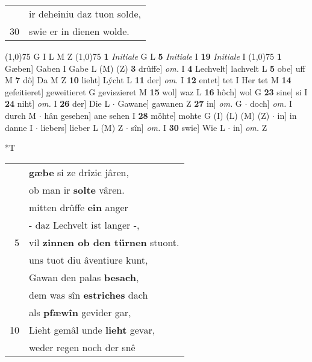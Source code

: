 \documentclass[8pt,a4paper,notitlepage]{article}
\begin{document}
\begin{table}[ht]
\begin{minipage}[t]{0.5\linewidth}
\begin{tabular}{rl}
 & ir deheiniu daz tuon solde,\\ 
30 & swie er in dienen wolde.\\ 
\end{tabular}
\scriptsize
\line(1,0){75} \newline
G I L M Z \newline
\line(1,0){75} \newline
\textbf{1} \textit{Initiale} G L  \textbf{5} \textit{Initiale} I  \textbf{19} \textit{Initiale} I  \newline
\line(1,0){75} \newline
\textbf{1} Gæben] Gaben I Gabe L (M) (Z) \textbf{3} drûffe] \textit{om.} I \textbf{4} Lechvelt] lachvelt L \textbf{5} obe] uff M \textbf{7} dô] Da M Z \textbf{10} lieht] Lýcht L \textbf{11} der] \textit{om.} I \textbf{12} entet] tet I Her tet M \textbf{14} gefeitieret] geweitieret G geviszieret M \textbf{15} wol] waz L \textbf{16} hôch] wol G \textbf{23} sine] si I \textbf{24} niht] \textit{om.} I \textbf{26} der] Die L  $\cdot$ Gawane] gawanen Z \textbf{27} in] \textit{om.} G  $\cdot$ doch] \textit{om.} I durch M  $\cdot$ hân gesehen] ane sehen I \textbf{28} möhte] mohte G (I) (L) (M) (Z)  $\cdot$ in] in danne I  $\cdot$ liebers] lieber L (M) Z  $\cdot$ sîn] \textit{om.} I \textbf{30} swie] Wie L  $\cdot$ in] \textit{om.} Z \newline
\end{minipage}
\hspace{0.5cm}
\begin{minipage}[t]{0.5\linewidth}
\small
\begin{center}*T
\end{center}
\begin{tabular}{rl}
 & \textbf{gæbe} si ze drîzic jâren,\\ 
 & ob man ir \textbf{solte} vâren.\\ 
 & mitten drûffe \textbf{ein} anger\\ 
 & - daz Lechvelt ist langer -,\\ 
5 & vil \textbf{zinnen ob den türnen} stuont.\\ 
 & uns tuot diu âventiure kunt,\\ 
 & Gawan den palas \textbf{besach},\\ 
 & dem was sîn \textbf{estriches} dach\\ 
 & als \textbf{pfæwîn} gevider gar,\\ 
10 & Lieht gemâl unde \textbf{lieht} gevar,\\ 
 & weder regen noch der snê\\ 

\end{tabular}
\end{minipage}
\end{table}
\end{document}

